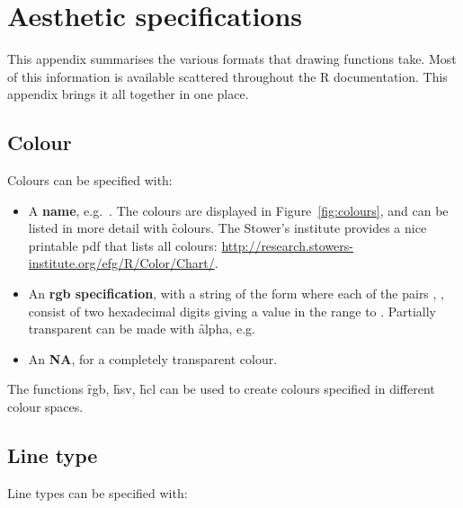 

\chapter{Aesthetic specifications}
\label{cha:specifications}

This appendix summarises the various formats that  drawing functions take.  Most of this information is available scattered throughout the R documentation.  This appendix brings it all together in one place.

\section{Colour}
\label{sec:colour_spec}

Colours can be specified with:

\begin{itemize}
  \item A {\bf name}, e.g.\ . The colours are displayed in Figure~\ref{fig:colours}, and can be listed in more detail with \f{colours}. The Stower's institute provides a nice printable pdf that lists all colours:  \url{http://research.stowers-institute.org/efg/R/Color/Chart/}.
    
  \item An {\bf rgb specification}, with a string of the form  where each of the pairs , ,  consist of two hexadecimal digits giving a value in the range  to .  Partially transparent can be made with \f{alpha}, e.g.\ 

  \item An {\bf NA}, for a completely transparent colour.  
\end{itemize}

The functions \f{rgb}, \f{hsv}, \f{hcl} can be used to create colours specified in different colour spaces.


\section{Line type}
\label{sec:line_type_spec}

Line types can be specified with:

